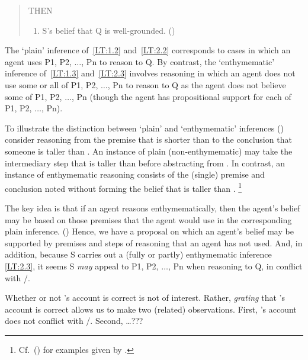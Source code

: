 \begin{note}
\begin{quote}
    THEN
    \begin{enumerate}[label=(3)]
    \item S's belief that Q is well-grounded.\nolinebreak
      \mbox{}\hfill\mbox{(\citeyear[87]{Moretti:2019wx})}
    \end{enumerate}
  \end{quote}

  The `plain' inference of~\ref{LT:1.2} and~\ref{LT:2.2} corresponds to cases in which an agent uses P1, P2, \(\dots\), Pn to reason to Q.
  By contrast, the `enthymematic' inference of~\ref{LT:1.3} and~\ref{LT:2.3} involves reasoning in which an agent does not use some or all of P1, P2, \(\dots\), Pn to reason to Q as the agent does not believe some of P1, P2, \(\dots\), Pn (though the agent has propositional support for each of P1, P2, \(\dots\), Pn).

  To illustrate the distinction between `plain' and `enthymematic' inferences (\citeyear[Cf.][85]{Moretti:2019wx}) consider reasoning from the premise that  is shorter than  to the conclusion that someone is taller than .
  An instance of plain (non-enthymematic) may take the intermediary step that  is taller than  before abstracting from .
  In contrast, an instance of enthymematic reasoning consists of the (single) premise and conclusion noted without forming the belief that  is taller than .\nolinebreak
  \footnote{Cf.\ (\citeyear[87--89]{Moretti:2019wx}) for examples given by \citeauthor{Moretti:2019wx}.}

  The key idea is that if an agent reasons enthymematically, then the agent's belief may be based on those premises that the agent would use in the corresponding plain inference.
  (\citeyear[Cf.][86--87]{Moretti:2019wx})
  Hence, we have a proposal on which an agent's belief may be supported by premises and steps of reasoning that an agent has not used.
  And, in addition, because S carries out a (fully or partly) enthymematic inference \ref{LT:2.3}, it seems S \emph{may} appeal to P1, P2, \(\dots\), Pn when reasoning to Q, in conflict with \issueConstraint{}/\issueInclusion{}.

  Whether or not \citeauthor{Moretti:2019wx}'s account is correct is not of interest.
  Rather, \emph{grating} that \citeauthor{Moretti:2019wx}'s account is correct allows us to make two (related) observations.
  First, \citeauthor{Moretti:2019wx}'s account does not conflict with \issueConstraint{}/\issueInclusion{}.
  Second, \dots ???
\end{note}

